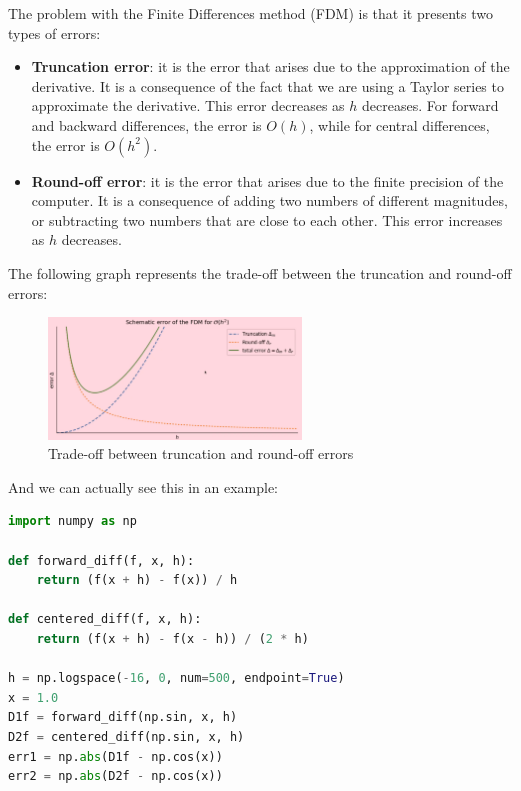 \begin{enumerate}
    The problem with the Finite Differences method (FDM) is that it presents two types of
    errors:

    \begin{itemize}
        \item \textbf{Truncation error}: it is the error that arises due to the approximation of the derivative.
        It is a consequence of the fact that we are using a Taylor series to approximate the derivative.
        This error decreases as $h$ decreases. For forward and backward differences, the error is $O(h)$, while
        for central differences, the error is $O(h^2)$.

        \item \textbf{Round-off error}: it is the error that arises due to the finite precision of the computer.
        It is a consequence of adding two numbers of different magnitudes, or subtracting two numbers that are 
        close to each other. This error increases as $h$ decreases. 
    \end{itemize}

    The following graph represents the trade-off between the truncation and round-off errors:

    \begin{figure}[H]
        \centering
        \includegraphics[width=0.6\textwidth]{figures/round-off_vs_trunc.png}
        \caption{Trade-off between truncation and round-off errors}
    \end{figure}

    And we can actually see this in an example:

    \begin{lstlisting}[language=Python]
import numpy as np

def forward_diff(f, x, h):
    return (f(x + h) - f(x)) / h

def centered_diff(f, x, h):
    return (f(x + h) - f(x - h)) / (2 * h)

h = np.logspace(-16, 0, num=500, endpoint=True)
x = 1.0
D1f = forward_diff(np.sin, x, h)
D2f = centered_diff(np.sin, x, h)
err1 = np.abs(D1f - np.cos(x))
err2 = np.abs(D2f - np.cos(x))
\end{lstlisting}


\end{enumerate}

